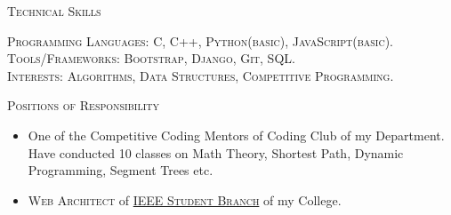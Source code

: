 \documentclass[11pt]{article}
\begin{document}
		{\centering\Large{\textsc{Technical Skills}}\hrulefill}
	
	\vspace{3mm}

	\normalsize{
	\textsc{Programming Languages:} \textsc{C, C++, Python(basic), JavaScript(basic).} \\
	\textsc{Tools/Frameworks:} \textsc{Bootstrap, Django, Git, SQL.}
	}\\
	\textsc{Interests:} \textsc{Algorithms, Data Structures, Competitive Programming.}
			
	\vspace{11mm}
	{\centering\Large{\textsc{Positions of Responsibility}}	\hrulefill}
		
	\vspace{1mm}		
	\setlength\itemsep{-0.25em}
	\begin{normalsize}
	
	\begin{itemize}

	\item One of the Competitive Coding Mentors of Coding Club of my Department. Have conducted 10 classes on Math Theory, Shortest Path, Dynamic Programming, Segment Trees etc.
	\item \textsc{Web Architect} of \textsc{\href{https://github.com/SSN-IEEE}{IEEE Student Branch}} of my College.
	\end{itemize}	
	\end{normalsize}
\end{document}
